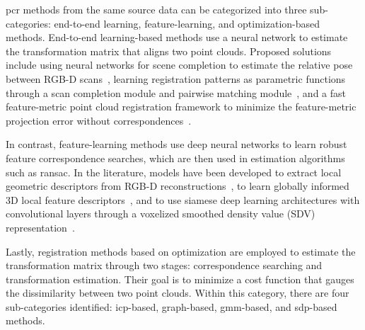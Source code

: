 \gls{pcr} methods from the same source data can be categorized into three sub-categories: end-to-end learning, feature-learning, and optimization-based methods. End-to-end learning-based methods use a neural network to estimate the transformation matrix that aligns two point clouds. Proposed solutions include using neural networks for scene completion to estimate the relative pose between RGB-D scans~\cite{extreme-relative-pose-estimation-for-rgb-d-scans-via-scene-completion}, learning registration patterns as parametric functions through a scan completion module and pairwise matching module~\cite{non-rigid-point-set-registration-networks}, and a fast feature-metric point cloud registration framework to minimize the feature-metric projection error without correspondences~\cite{feature-metric-registration:-a-fast-semi-supervised-approach-for-robust-point-cloud-registration-without-correspondences}.\medskip

In contrast, feature-learning methods use deep neural networks to learn robust feature correspondence searches, which are then used in estimation algorithms such as \gls{ransac}. In the literature, models have been developed to extract local geometric descriptors from RGB-D reconstructions~\cite{3dmatch:-learning-local-geometric-descriptors-from-rgb-d-reconstructions}, to learn globally informed 3D local feature descriptors~\cite{ppfnet:-global-context-aware-local-features-for-robust-3d-point-matching}, and to use siamese deep learning architectures with convolutional layers through a voxelized smoothed density value (SDV) representation~\cite{the-perfect-match:-3d-point-cloud-matching-with-smoothed-densities}. \medskip










Lastly, registration methods based on optimization are employed to estimate the transformation matrix through two stages: correspondence searching and transformation estimation. Their goal is to minimize a cost function that gauges the dissimilarity between two point clouds. Within this category, there are four sub-categories identified: \gls{icp}-based, graph-based, \gls{gmm}-based, and \gls{sdp}-based methods. \medskip

